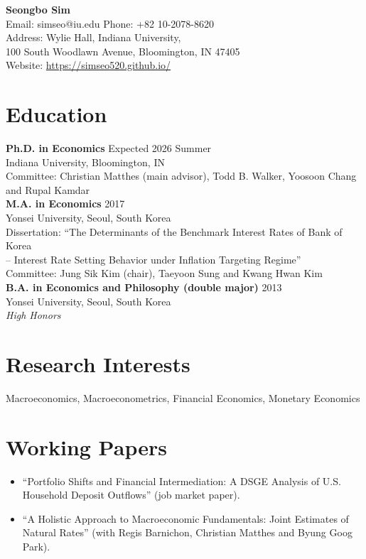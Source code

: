 \documentclass[11pt,a4paper]{article}
\begin{document}
\begin{center}
    {\LARGE \textbf{Seongbo Sim}} \\
    \vspace{2mm}
    Email: simseo@iu.edu \quad Phone: +82 10-2078-8620 \\
    Address: Wylie Hall, Indiana University, \\ 100 South Woodlawn Avenue, Bloomington, IN 47405 \\    
    Website: \url{https://simseo520.github.io/}
\end{center}

\vspace{5mm}

\section*{Education}
\textbf{Ph.D. in Economics} \hfill Expected 2026 Summer \\
Indiana University, Bloomington, IN \\
Committee: Christian Matthes (main advisor), Todd B. Walker, Yoosoon Chang and Rupal Kamdar \\

\textbf{M.A. in Economics} \hfill 2017 \\
Yonsei University, Seoul, South Korea \\
Dissertation: “The Determinants of the Benchmark Interest Rates of Bank of Korea\\
\phantom{Dissertation:} -- {\footnotesize Interest Rate Setting Behavior under Inflation Targeting Regime}” \\
Committee: Jung Sik Kim (chair), Taeyoon Sung and Kwang Hwan Kim\\


\textbf{B.A. in Economics and Philosophy (double major)} \hfill 2013 \\
Yonsei University, Seoul, South Korea \\
\emph{High Honors}\\

\section*{Research Interests}
Macroeconomics, Macroeconometrics, Financial Economics, Monetary Economics

\section*{Working Papers} 
\begin{itemize}[leftmargin=*]
    \item ``Portfolio Shifts and Financial Intermediation: A DSGE Analysis of U.S. Household Deposit Outflows'' (job market paper).
    \item ``A Holistic Approach to Macroeconomic
        Fundamentals: Joint Estimates of
        Natural Rates'' (with Regis Barnichon, Christian Matthes and Byung Goog Park).    
\end{itemize}
\end{document}

